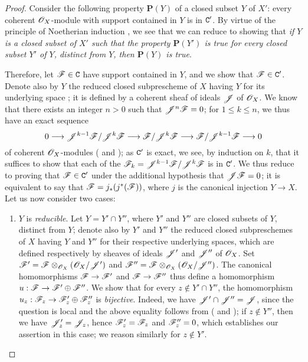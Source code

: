 \begin{proof}
\label{proof-3.3.1.2}
Consider the following property $\textbf{P}(Y)$ of a closed subset $Y$ of $X'$: every coherent $\mathscr{O}_X$-module with support contained in $Y$ is in $\mathtt{C}'$.
By virtue of the principle of Noetherian induction , we see that we can reduce to showing that \emph{if $Y$ is a closed subset of $X'$ such that the property $\textbf{P}(Y')$ is true for every closed subset $Y'$ of $Y$, distinct from $Y$, then $\textbf{P}(Y)$ is true}.

Therefore, let $\mathscr{F}\in\mathtt{C}$ have support contained in $Y$, and we show that $\mathscr{F}\in\mathtt{C}'$.
Denote also by $Y$ the reduced closed subprescheme of $X$ having $Y$ for its underlying space ; it is defined by a coherent sheaf of ideals $\mathscr{J}$ of $\mathscr{O}_X$.
We know  that there exists an integer $n>0$ such that $\mathscr{J}^n\mathscr{F}=0$; for $1\leq k\leq n$, we thus have an exact sequence
\[
  0\to\sh{J}^{k-1}\sh{F}/\sh{J}^k\sh{F}\to\sh{F}/\sh{J}^k\sh{F}\to\sh{F}/\sh{J}^{k-1}\sh{F}\to 0
\]
 of coherent $\mathscr{O}_X$-modules ( and ); as $\mathtt{C}'$ is exact, we see, by induction on $k$, that it suffices to show that each of the $\mathscr{F}_k=\mathscr{J}^{k-1}\mathscr{F}/\mathscr{J}^k\mathscr{F}$ is in $\mathtt{C}'$.
We thus reduce to proving that $\mathscr{F}\in\mathtt{C}'$ under the additional hypothesis that $\mathscr{J}\mathscr{F}=0$; it is equivalent to say that $\mathscr{F}=j_*(j^*(\mathscr{F}))$, where $j$ is the canonical injection $Y\to X$.
Let us now consider two cases:
\begin{enumerate}[label=(\alph*)]
  \item $Y$ is \emph{reducible}.
    Let $Y=Y'\cap Y''$, where $Y'$ and $Y''$ are closed subsets of $Y$, distinct from $Y$; denote also by $Y'$ and $Y''$ the reduced closed subpreschemes of $X$ having $Y$ and $Y''$ for their respective underlying spaces, which are defined respectively by sheaves of ideals $\mathscr{J}'$ and $\mathscr{J}''$ of $\mathscr{O}_X$.
    Set $\mathscr{F}'=\mathscr{F}\otimes_{\mathscr{O}_X}(\mathscr{O}_X/\mathscr{J}')$ and $\mathscr{F}''=\mathscr{F}\otimes_{\mathscr{O}_X}(\mathscr{O}_X/\mathscr{J}'')$.
    The canonical homomorphisms $\sh{F}\to\sh{F}'$ and $\sh{F}\to\sh{F}''$ thus define a homomorphism $u:\sh{F}\to\sh{F}'\oplus\sh{F}''$.
    We show that for every $z\not\in Y'\cap Y''$, the homomorphism $u_z:\sh{F}_z\to\sh{F}_z'\oplus\sh{F}_z''$ is \emph{bijective}.
    Indeed, we have $\mathscr{J}'\cap\mathscr{J}''=\mathscr{J}$, since the question is local and
    the above equality follows from ( and ); if $z\not\in Y''$, then we have $\mathscr{J}_z'=\mathscr{J}_z$, hence $\mathscr{F}_z'=\mathscr{F}_z$ and $\mathscr{F}_z''=0$, which establishes our assertion in this case; we reason similarly for $z\not\in Y'$.

\end{enumerate}
\end{proof}
